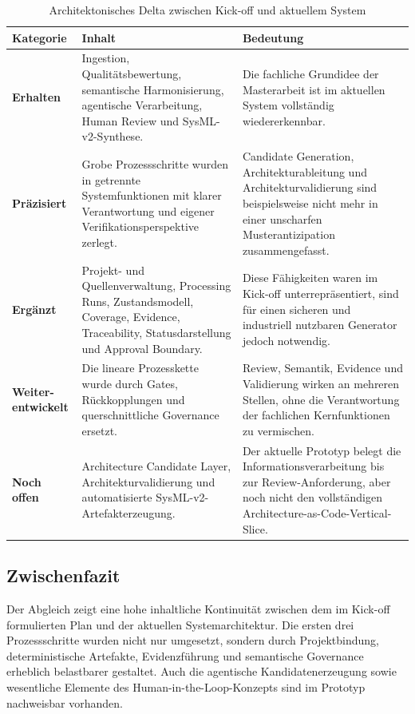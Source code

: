 \begin{table}[htbp]
\centering
\caption{Architektonisches Delta zwischen Kick-off und aktuellem System}
\label{tab:kickoff_delta}
\small
\begin{tabularx}{\textwidth}{
  >{\RaggedRight\arraybackslash}p{3.0cm}
  >{\RaggedRight\arraybackslash}X
  >{\RaggedRight\arraybackslash}X
}
\toprule
\textbf{Kategorie} & \textbf{Inhalt} & \textbf{Bedeutung} \\
\midrule
\textbf{Erhalten} &
Ingestion, Qualitätsbewertung, semantische Harmonisierung, agentische Verarbeitung, Human Review und SysML-v2-Synthese. &
Die fachliche Grundidee der Masterarbeit ist im aktuellen System vollständig wiedererkennbar. \\
\addlinespace
\textbf{Präzisiert} &
Grobe Prozessschritte wurden in getrennte Systemfunktionen mit klarer Verantwortung und eigener Verifikationsperspektive zerlegt. &
Candidate Generation, Architekturableitung und Architekturvalidierung sind beispielsweise nicht mehr in einer unscharfen Musterantizipation zusammengefasst. \\
\addlinespace
\textbf{Ergänzt} &
Projekt- und Quellenverwaltung, Processing Runs, Zustandsmodell, Coverage, Evidence, Traceability, Statusdarstellung und Approval Boundary. &
Diese Fähigkeiten waren im Kick-off unterrepräsentiert, sind für einen sicheren und industriell nutzbaren Generator jedoch notwendig. \\
\addlinespace
\textbf{Weiter-\newline entwickelt} &
Die lineare Prozesskette wurde durch Gates, Rückkopplungen und querschnittliche Governance ersetzt. &
Review, Semantik, Evidence und Validierung wirken an mehreren Stellen, ohne die Verantwortung der fachlichen Kernfunktionen zu vermischen. \\
\addlinespace
\textbf{Noch offen} &
Architecture Candidate Layer, Architekturvalidierung und automatisierte SysML-v2-Artefakterzeugung. &
Der aktuelle Prototyp belegt die Informationsverarbeitung bis zur Review-Anforderung, aber noch nicht den vollständigen Architecture-as-Code-Vertical-Slice. \\
\bottomrule
\end{tabularx}
\normalsize
\end{table}

\subsection{Zwischenfazit}

Der Abgleich zeigt eine hohe inhaltliche Kontinuität zwischen dem im Kick-off formulierten Plan und der aktuellen Systemarchitektur. Die ersten drei Prozessschritte wurden nicht nur umgesetzt, sondern durch Projektbindung, deterministische Artefakte, Evidenzführung und semantische Governance erheblich belastbarer gestaltet. Auch die agentische Kandidatenerzeugung sowie wesentliche Elemente des Human-in-the-Loop-Konzepts sind im Prototyp nachweisbar vorhanden.

